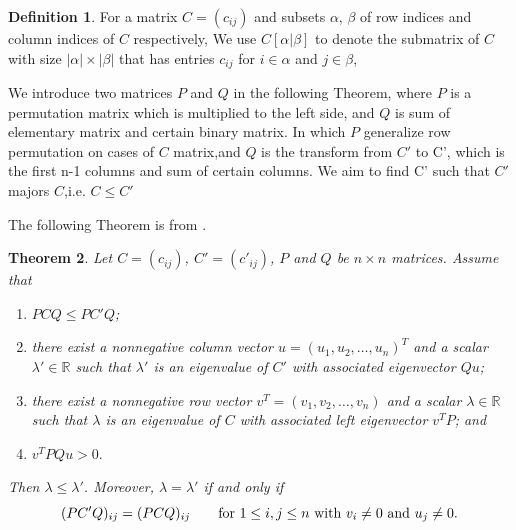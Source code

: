 \documentclass{article}
\theoremstyle{plain}
\newtheorem{thm}{Theorem}[section]
\theoremstyle{definition}
\newtheorem{defn}[thm]{Definition}
\begin{document}
\begin{defn}
    For a matrix $C=(c_{ij})$ and subsets $\alpha$, $\beta$ of row indices and column 
    indices of $C$ respectively,  We use $C[\alpha|\beta]$ to denote the 
    submatrix of $C$ with size $ |\alpha| \times |\beta| $ that has entries $c_{ij}$ for $i\in \alpha$
    and $j\in\beta$,
\end{defn}


We introduce two matrices $P$ and $Q$ in the following Theorem, where $P$ is a permutation
 matrix which is multiplied to the left side, and $Q$ is sum of elementary matrix and
 certain binary matrix. In which $P$ generalize row permutation on cases of $C$
 matrix,and $Q$ is the transform from $C'$ to C', which is the first n-1 columns
  and sum of certain columns. We aim to find C' such that $C'$ majors $C$,i.e. $C\leq C'$
 
The following Theorem is from \cite{chang}.

\begin{thm}\label{pre_thm}
    Let $C=(c_{ij})$, $C'=(c'_{ij})$, $P$ and $Q$ be  $n\times n$ matrices.
Assume that
\begin{enumerate}[label=(\roman*)]
    \item \label{pre_thm_em1}  $PCQ\leq PC'Q$;
    \item \label{pre_thm_em2} there exist a nonnegative column vector $u=(u_1, u_2, \ldots, u_n)^T$  and a
    scalar $\lambda'\in \mathbb{R}$ such that $\lambda'$ is an eigenvalue of $C'$ with
    associated eigenvector $Qu$;
    \item \label{pre_thm_em3}  there exist a nonnegative row vector $v^T=(v_1, v_2, \ldots, v_n)$  and a scalar
    $\lambda\in \mathbb{R}$such that $\lambda$ is an eigenvalue of $C$ with associated  left
    eigenvector $v^TP$; and
    \item \label{pre_thm_em4} $v^TPQu>0.$
\end{enumerate}
    Then $\lambda\leq \lambda'$. Moreover, $\lambda=\lambda'$ if and only if
    \begin{equation}\label{pre0}
        (PC'Q)_{ij}=(PCQ)_{ij}\qquad \hbox{for~}1\leq i, j\leq n \hbox{~with~} v_i\ne 0 \hbox{~and~} u_j\ne 0.
    \end{equation}
\end{thm}
\end{document}
